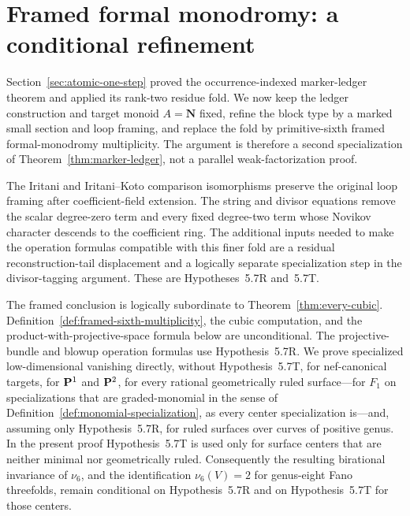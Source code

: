 \section{Framed formal monodromy: a conditional refinement}
\label{sec:framed-monodromy}

Section~\ref{sec:atomic-one-step} proved the occurrence-indexed marker-ledger
theorem and applied its rank-two residue fold.  We now keep the ledger
construction and target monoid \(A=\mathbf N\) fixed, refine the block type by
a marked small section and loop framing, and replace the fold by
primitive-sixth framed formal-monodromy multiplicity.  The argument is
therefore a second specialization of Theorem~\ref{thm:marker-ledger}, not a
parallel weak-factorization proof.

The Iritani and Iritani--Koto comparison isomorphisms preserve the original
loop framing after coefficient-field extension.  The string and divisor
equations remove the scalar degree-zero term and every fixed degree-two term
whose Novikov character descends to the coefficient ring.  The additional
inputs needed to make the operation formulas compatible with this finer fold
are a residual reconstruction-tail displacement and a logically separate
specialization step in the divisor-tagging argument.  These are
Hypotheses~5.7R and~5.7T.

The framed conclusion is logically subordinate to
Theorem~\ref{thm:every-cubic}.  Definition~\ref{def:framed-sixth-multiplicity},
the cubic computation, and the product-with-projective-space formula below
are unconditional.  The projective-bundle and blowup operation formulas
use Hypothesis~5.7R.  We prove specialized low-dimensional vanishing
directly, without Hypothesis~5.7T, for nef-canonical targets, for
\(\mathbf P^1\) and \(\mathbf P^2\), for every rational geometrically ruled surface---for
\(F_1\) on specializations that are graded-monomial in the sense of
Definition~\ref{def:monomial-specialization}, as every center specialization
is---and, assuming only Hypothesis~5.7R, for ruled surfaces over curves of
positive genus.  In the present proof Hypothesis~5.7T is used only
for surface centers that are neither minimal nor geometrically ruled.
Consequently the resulting birational invariance
of \(\nu_6\), and the identification \(\nu_6(V)=2\) for genus-eight Fano
threefolds, remain conditional on Hypothesis~5.7R and on Hypothesis~5.7T for
those centers.


